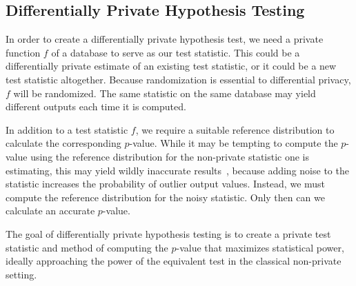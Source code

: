 
\subsection{Differentially Private Hypothesis Testing}
In order to create a differentially private hypothesis test, we need a private function $f$ of a database to serve as our test statistic. This could be a differentially private estimate of an existing test statistic, or it could be a new test statistic altogether. Because randomization is essential to differential privacy, $f$ will be randomized. The same statistic on the same database may yield different outputs each time it is computed.

In addition to a test statistic $f$, we require a suitable reference distribution to calculate the corresponding $p$-value. While it may be tempting to compute the $p$-value using the reference distribution for the non-private statistic one is estimating, this may yield wildly inaccurate results~\cite{campbell2018diffprivanova}, because adding noise to the statistic increases the probability of outlier output values. Instead, we must compute the reference distribution for the noisy statistic. Only then can we calculate an accurate $p$-value. 

The goal of differentially private hypothesis testing is to create a private test statistic and method of computing the $p$-value that maximizes statistical power, ideally approaching the power of the equivalent test in the classical non-private setting.